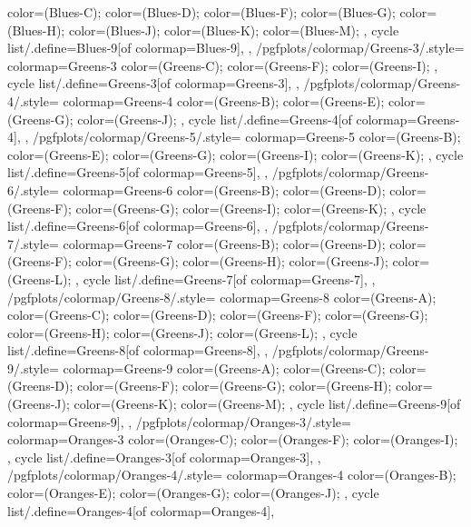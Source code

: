 {{{      color=(Blues-C);
      color=(Blues-D);
      color=(Blues-F);
      color=(Blues-G);
      color=(Blues-H);
      color=(Blues-J);
      color=(Blues-K);
      color=(Blues-M);
    },
    cycle list/.define={Blues-9}{[of colormap=Blues-9]},
  },
  /pgfplots/colormap/Greens-3/.style={
    colormap={Greens-3}{
      color=(Greens-C);
      color=(Greens-F);
      color=(Greens-I);
    },
    cycle list/.define={Greens-3}{[of colormap=Greens-3]},
  },
  /pgfplots/colormap/Greens-4/.style={
    colormap={Greens-4}{
      color=(Greens-B);
      color=(Greens-E);
      color=(Greens-G);
      color=(Greens-J);
    },
    cycle list/.define={Greens-4}{[of colormap=Greens-4]},
  },
  /pgfplots/colormap/Greens-5/.style={
    colormap={Greens-5}{
      color=(Greens-B);
      color=(Greens-E);
      color=(Greens-G);
      color=(Greens-I);
      color=(Greens-K);
    },
    cycle list/.define={Greens-5}{[of colormap=Greens-5]},
  },
  /pgfplots/colormap/Greens-6/.style={
    colormap={Greens-6}{
      color=(Greens-B);
      color=(Greens-D);
      color=(Greens-F);
      color=(Greens-G);
      color=(Greens-I);
      color=(Greens-K);
    },
    cycle list/.define={Greens-6}{[of colormap=Greens-6]},
  },
  /pgfplots/colormap/Greens-7/.style={
    colormap={Greens-7}{
      color=(Greens-B);
      color=(Greens-D);
      color=(Greens-F);
      color=(Greens-G);
      color=(Greens-H);
      color=(Greens-J);
      color=(Greens-L);
    },
    cycle list/.define={Greens-7}{[of colormap=Greens-7]},
  },
  /pgfplots/colormap/Greens-8/.style={
    colormap={Greens-8}{
      color=(Greens-A);
      color=(Greens-C);
      color=(Greens-D);
      color=(Greens-F);
      color=(Greens-G);
      color=(Greens-H);
      color=(Greens-J);
      color=(Greens-L);
    },
    cycle list/.define={Greens-8}{[of colormap=Greens-8]},
  },
  /pgfplots/colormap/Greens-9/.style={
    colormap={Greens-9}{
      color=(Greens-A);
      color=(Greens-C);
      color=(Greens-D);
      color=(Greens-F);
      color=(Greens-G);
      color=(Greens-H);
      color=(Greens-J);
      color=(Greens-K);
      color=(Greens-M);
    },
    cycle list/.define={Greens-9}{[of colormap=Greens-9]},
  },
  /pgfplots/colormap/Oranges-3/.style={
    colormap={Oranges-3}{
      color=(Oranges-C);
      color=(Oranges-F);
      color=(Oranges-I);
    },
    cycle list/.define={Oranges-3}{[of colormap=Oranges-3]},
  },
  /pgfplots/colormap/Oranges-4/.style={
    colormap={Oranges-4}{
      color=(Oranges-B);
      color=(Oranges-E);
      color=(Oranges-G);
      color=(Oranges-J);
    },
    cycle list/.define={Oranges-4}{[of colormap=Oranges-4]},
}}
